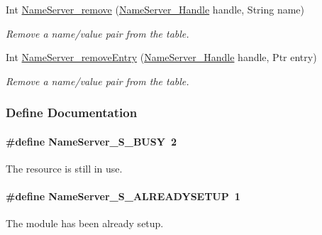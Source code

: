 \begin{DoxyCompactItemize}
Int \hyperlink{_name_server_8h_ab21d262bcfa187f21e235b36ce17d6de}{NameServer\_\-remove} (\hyperlink{_name_server_8h_a99fa93c4ee4169db90162b523d9152d4}{NameServer\_\-Handle} handle, String name)
\begin{DoxyCompactList}\small\item\em Remove a name/value pair from the table. \item\end{DoxyCompactList}\item 
Int \hyperlink{_name_server_8h_a84b6883f07de21bcaf8f4dbdc2e55e63}{NameServer\_\-removeEntry} (\hyperlink{_name_server_8h_a99fa93c4ee4169db90162b523d9152d4}{NameServer\_\-Handle} handle, Ptr entry)
\begin{DoxyCompactList}\small\item\em Remove a name/value pair from the table. \item\end{DoxyCompactList}\end{DoxyCompactItemize}


\subsubsection{Define Documentation}
\paragraph[{NameServer\_\-S\_\-BUSY}]{\setlength{\rightskip}{0pt plus 5cm}\#define NameServer\_\-S\_\-BUSY~2}\hfill\label{_name_server_8h_a57542b4fd6b5d46d78064ae92215bc4b}


The resource is still in use. 

\paragraph[{NameServer\_\-S\_\-ALREADYSETUP}]{\setlength{\rightskip}{0pt plus 5cm}\#define NameServer\_\-S\_\-ALREADYSETUP~1}\hfill\label{_name_server_8h_a66224beb4a7f1cc92923a8fe630429ce}


The module has been already setup. 

